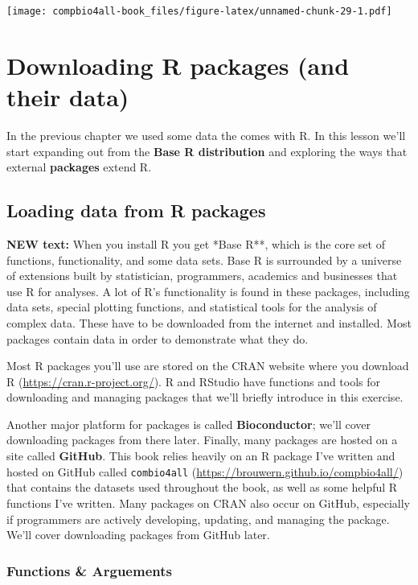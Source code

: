 \documentclass[
]{book}
\begin{document}
\texttt{[image: compbio4all-book\_files/figure-latex/unnamed-chunk-29-1.pdf]}

\hypertarget{downloading-r-packages-and-their-data}{%
\chapter{Downloading R packages (and their data)}\label{downloading-r-packages-and-their-data}}

In the previous chapter we used some data the comes with R. In this lesson we'll start expanding out from the \textbf{Base R distribution} and exploring the ways that external \textbf{packages} extend R.

\hypertarget{loading-data-from-r-packages}{%
\section{Loading data from R packages}\label{loading-data-from-r-packages}}

\textbf{NEW text:}
When you install R you get *Base R**, which is the core set of functions, functionality, and some data sets. Base R is surrounded by a universe of extensions built by statistician, programmers, academics and businesses that use R for analyses. A lot of R's functionality is found in these packages, including data sets, special plotting functions, and statistical tools for the analysis of complex data. These have to be downloaded from the internet and installed. Most packages contain data in order to demonstrate what they do.

Most R packages you'll use are stored on the CRAN website where you download R (\url{https://cran.r-project.org/}). R and RStudio have functions and tools for downloading and managing packages that we'll briefly introduce in this exercise.

Another major platform for packages is called \textbf{Bioconductor}; we'll cover downloading packages from there later. Finally, many packages are hosted on a site called \textbf{GitHub}. This book relies heavily on an R package I've written and hosted on GitHub called \texttt{combio4all} (\url{https://brouwern.github.io/compbio4all/}) that contains the datasets used throughout the book, as well as some helpful R functions I've written. Many packages on CRAN also occur on GitHub, especially if programmers are actively developing, updating, and managing the package. We'll cover downloading packages from GitHub later.

\hypertarget{functions-arguements}{%
\subsection{Functions \& Arguements}\label{functions-arguements}}
\end{document}
